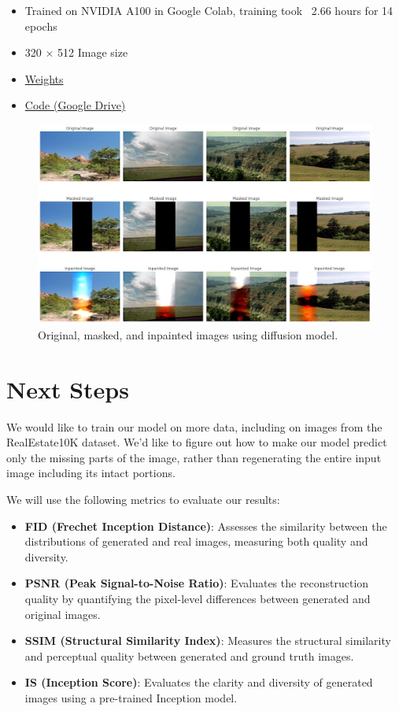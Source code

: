 \documentclass[sigconf]{acmart}
\begin{document}
\begin{itemize}
    \item Trained on NVIDIA A100 in Google Colab, training took ~2.66 hours for 14 epochs
    \item 320 $\times$ 512 Image size
    \item \textcolor{red}{\href{https://drive.google.com/file/d/1-wr7a01nVmRRFrYpwbjaQlc0FIDKINvY/view?usp=sharing}{Weights}}
    \item \textcolor{red}{\href{https://colab.research.google.com/drive/1XZfe98Ox-r8rhJx-8WGiJiJjFm-hb6yO?authuser=2}{Code (Google Drive)}}
\end{itemize}

\begin{figure}[h]
    \centering
    \includegraphics[width=0.8\linewidth]{diffusion_results.png}
    \caption{Original, masked, and inpainted images using diffusion model.}
\end{figure}

\section*{Next Steps}
We would like to train our model on more data, including on images from the RealEstate10K dataset. We’d like to figure out how to make our model predict only the missing parts of the image, rather than regenerating the entire input image including its intact portions.

We will use the following metrics to evaluate our results:
\begin{itemize}
    \item \textbf{FID (Frechet Inception Distance)}: Assesses the similarity between the distributions of generated and real images, measuring both quality and diversity.
    \item \textbf{PSNR (Peak Signal-to-Noise Ratio)}: Evaluates the reconstruction quality by quantifying the pixel-level differences between generated and original images.
    \item \textbf{SSIM (Structural Similarity Index)}: Measures the structural similarity and perceptual quality between generated and ground truth images.
    \item \textbf{IS (Inception Score)}: Evaluates the clarity and diversity of generated images using a pre-trained Inception model.
\end{itemize}
\end{document}
